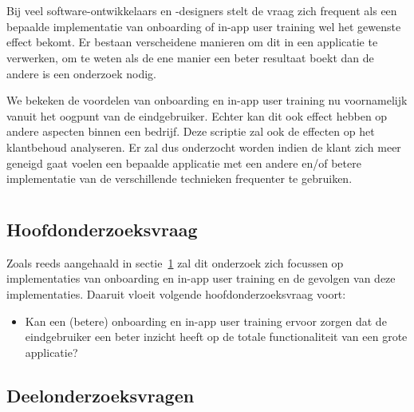 \section{}
\label{sec:probleemstelling}

Bij veel software-ontwikkelaars en -designers stelt de vraag zich frequent als een bepaalde implementatie van onboarding of in-app user training wel het gewenste effect bekomt. Er bestaan verscheidene manieren om dit in een applicatie te verwerken, om te weten als de ene manier een beter resultaat boekt dan de andere is een onderzoek nodig.

We bekeken de voordelen van onboarding en in-app user training nu voornamelijk vanuit het oogpunt van de eindgebruiker. Echter kan dit ook effect hebben op andere aspecten binnen een bedrijf. Deze scriptie zal ook de effecten op het klantbehoud analyseren. Er zal dus onderzocht worden indien de klant zich meer geneigd gaat voelen een bepaalde applicatie met een andere en/of betere implementatie van de verschillende technieken frequenter te gebruiken.

\section{}
\label{sec:onderzoeksvraag}

\subsection{Hoofdonderzoeksvraag}
\label{sec:hoofdonderzoeksvraag}

Zoals reeds aangehaald in sectie~\ref{sec:probleemstelling} zal dit onderzoek zich focussen op implementaties van onboarding en in-app user training en de gevolgen van deze implementaties. Daaruit vloeit volgende hoofdonderzoeksvraag voort:

\begin{itemize}
    \item Kan een (betere) onboarding en in-app user training ervoor zorgen dat de eindgebruiker een beter inzicht heeft op de totale functionaliteit van een grote applicatie?
\end{itemize}

\subsection{Deelonderzoeksvragen}
\label{sec:deelonderzoeksvragen}

